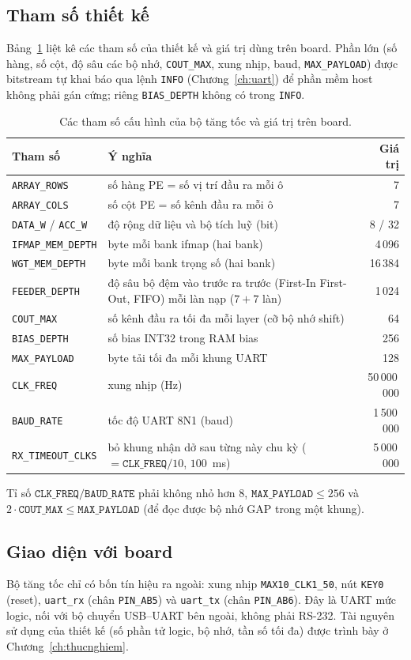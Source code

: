 \subsection{Tham số thiết kế}
Bảng~\ref{tab:thamso} liệt kê các tham số của thiết kế và giá trị dùng trên board.
Phần lớn (số hàng, số cột, độ sâu các bộ nhớ, \texttt{COUT\_MAX}, xung nhịp, baud, \texttt{MAX\_PAYLOAD}) được bitstream tự khai báo qua lệnh \texttt{INFO} (Chương~\ref{ch:uart}) để phần mềm host không phải gán cứng; riêng \texttt{BIAS\_DEPTH} không có trong \texttt{INFO}.

\begin{table}[htbp]\centering
\caption{Các tham số cấu hình của bộ tăng tốc và giá trị trên board.}\label{tab:thamso}
\small\setlength{\tabcolsep}{4pt}
\begin{tabular}{@{}p{3.6cm}p{7.6cm}r@{}}
\toprule
Tham số & Ý nghĩa & Giá trị \\ \midrule
\texttt{ARRAY\_ROWS} & số hàng PE = số vị trí đầu ra mỗi ô & 7 \\
\texttt{ARRAY\_COLS} & số cột PE = số kênh đầu ra mỗi ô & 7 \\
\texttt{DATA\_W} / \texttt{ACC\_W} & độ rộng dữ liệu và bộ tích luỹ (bit) & 8 / 32 \\
\texttt{IFMAP\_MEM\_DEPTH} & byte mỗi bank ifmap (hai bank) & 4\,096 \\
\texttt{WGT\_MEM\_DEPTH} & byte mỗi bank trọng số (hai bank) & 16\,384 \\
\texttt{FEEDER\_DEPTH} & độ sâu bộ đệm vào trước ra trước (First-In First-Out, FIFO) mỗi làn nạp ($7+7$ làn) & 1\,024 \\
\texttt{COUT\_MAX} & số kênh đầu ra tối đa mỗi layer (cỡ bộ nhớ shift) & 64 \\
\texttt{BIAS\_DEPTH} & số bias INT32 trong RAM bias & 256 \\
\texttt{MAX\_PAYLOAD} & byte tải tối đa mỗi khung UART & 128 \\
\texttt{CLK\_FREQ} & xung nhịp (Hz) & 50\,000\,000 \\
\texttt{BAUD\_RATE} & tốc độ UART 8N1 (baud) & 1\,500\,000 \\
\texttt{RX\_TIMEOUT\_CLKS} & bỏ khung nhận dở sau từng này chu kỳ ($=\texttt{CLK\_FREQ}/10$, $100$~ms) & 5\,000\,000 \\ \bottomrule
\end{tabular}
\end{table}

Tỉ số $\texttt{CLK\_FREQ}/\texttt{BAUD\_RATE}$ phải không nhỏ hơn $8$, $\texttt{MAX\_PAYLOAD}\le256$ và $2\cdot\texttt{COUT\_MAX}\le\texttt{MAX\_PAYLOAD}$ (để đọc được bộ nhớ GAP trong một khung).

\subsection{Giao diện với board}
Bộ tăng tốc chỉ có bốn tín hiệu ra ngoài: xung nhịp \texttt{MAX10\_CLK1\_50}, nút \texttt{KEY0} (reset), \texttt{uart\_rx} (chân \texttt{PIN\_AB5}) và \texttt{uart\_tx} (chân \texttt{PIN\_AB6}).
Đây là UART mức logic, nối với bộ chuyển USB--UART bên ngoài, không phải RS-232.
Tài nguyên sử dụng của thiết kế (số phần tử logic, bộ nhớ, tần số tối đa) được trình bày ở Chương~\ref{ch:thucnghiem}.
